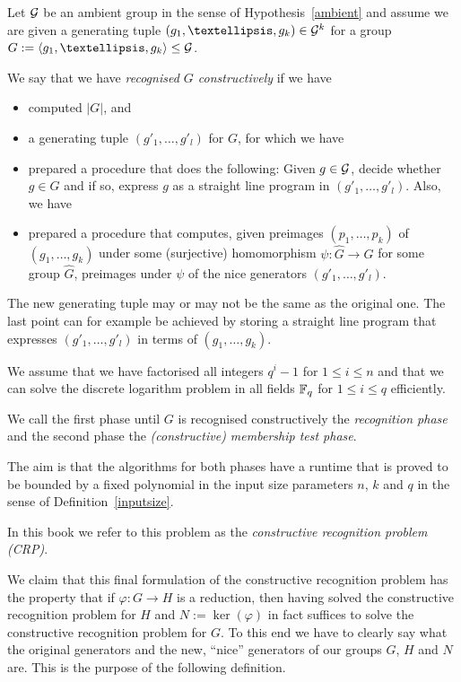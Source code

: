 \begin{Problem}
\label{ProbCR3}
Let $\mathcal{G}$ be an ambient group in the sense of Hypothesis~\ref{ambient} and 
assume we are given a generating tuple $(g_1, \ldots, g_k) \in
\GG^k$ for a group $G := \left< g_1, \ldots, g_k \right> \le \GG$. 

We say that we have \emph{recognised $G$ constructively} if we have 
\begin{itemize}
\item computed $|G|$, and
\item a generating tuple $( g'_1, \ldots, g'_l )$ for $G$, for which we have
\item 
prepared a procedure that does the following: Given $g \in \mathcal{G}$,
decide whether $g \in G$ and if so, express $g$ as a straight line program
in $(g'_1, \ldots, g'_l)$. Also, we have
\item prepared a procedure that computes, given preimages $(p_1, \ldots,
p_k)$ of $(g_1, \ldots, g_k)$ under some (surjective) homomorphism $\psi
: \hat G \to G$ for some group $\hat G$, preimages under $\psi$ of the
nice generators $(g'_1, \ldots, g'_l)$.
\end{itemize}
The new generating tuple may or may not be the same as the original one.
The last point can for example be achieved by storing a straight line
program that expresses $(g'_1, \ldots, g'_l)$ in terms of $(g_1, \ldots,
g_k)$.

We assume that we have factorised all integers $q^i-1$ for $1 \le i \le n$
and that we can solve the discrete logarithm problem in all fields $\mathbb{F}_q$
for $1 \le i \le q$ efficiently. 

We call the first phase until $G$ is
recognised constructively the \emph{recognition phase} and the second
phase the \emph{(constructive) membership test phase}.

The aim is that the algorithms for both phases have a runtime that is proved
to be bounded by a fixed polynomial in the input size parameters $n$, $k$
and $q$ in the sense of Definition~\ref{inputsize}.

In this book we refer to this problem as the \emph{constructive recognition
problem (CRP)}.
\proofend
\end{Problem}

We claim that this final formulation of the constructive recognition
problem has the property that if $\varphi : G \to H$ is a reduction, then
having solved the constructive recognition problem for $H$ and $N :=
\ker(\varphi)$ in fact suffices to solve the constructive recognition
problem for $G$. To this end we have to
clearly say what the original generators and the new, ``nice'' generators
of our groups $G$, $H$ and $N$ are. This is the purpose of the following
definition.

